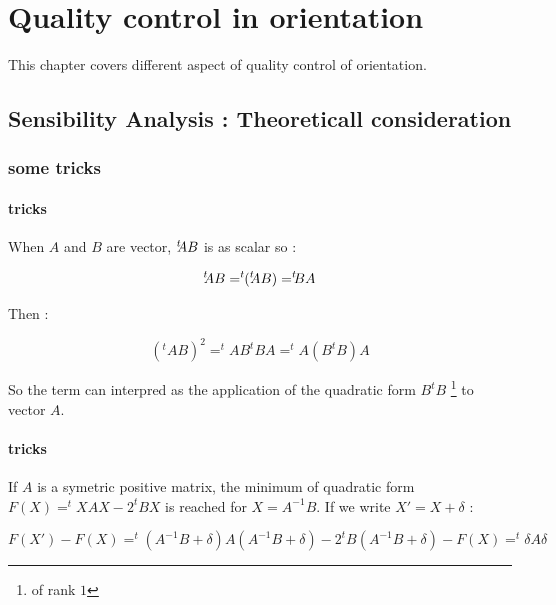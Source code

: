 \chapter{Quality control in orientation}

This chapter covers different aspect of quality control of orientation.



\section{Sensibility Analysis : Theoreticall consideration}

\subsection{some tricks}

\subsubsection{tricks}
When $A$ and $B$ are vector, $ ^{t} \!\! A  B$ is as scalar so :


\begin{equation}
     \transs A B =  \transs ( \transs A B) =  \transss B A  \label{Trick:tABEqtBA}
\end{equation}

Then  :

\begin{equation}
     (^t A  B) ^2 =  ^t A B ^t B A  = ^t A (B ^t B) A \label{Trick:tAB2}
\end{equation}

So the term can interpred as the application of the quadratic form $B ^t B$  \footnote{of rank $1$}  to vector $A$.

\subsubsection{tricks}

If $A$ is a symetric positive matrix,
the minimum of quadratic form $F(X) = ^t X A X - 2^t B X$ is reached for $X=A^{-1} B$.
If we write $X' = X + \delta $ :

\begin{equation}
  F(X') -F(X)  = ^t (A^{-1} B+\delta) A (A^{-1} B+\delta) -  2^t B (A^{-1} B + \delta) -F(X)
          =  ^t \delta A \delta 
\end{equation}

